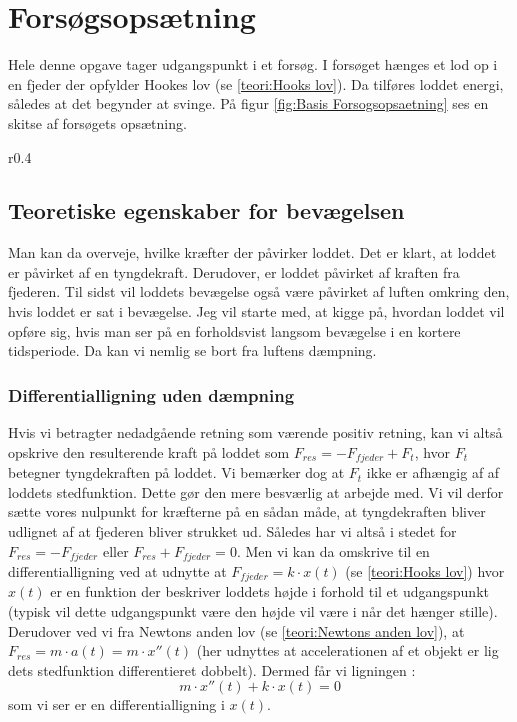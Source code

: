 \section{Forsøgsopsætning}\label{teori: opsatning af differentialligninger}
Hele denne opgave tager udgangspunkt i et forsøg.
I forsøget hænges et lod op i en fjeder der opfylder Hookes lov (se \ref{teori:Hooks lov}). 
Da tilføres loddet energi, således at det begynder at svinge. 
På figur \ref{fig:Basis Forsogsopsaetning} ses en skitse af forsøgets opsætning.

\begin{wrapfigure}{r}{0.4\textwidth}
\centering
{}%

\caption{Skitse af forsøgsopsætning.}
\label{fig:Basis Forsogsopsaetning}
\end{wrapfigure} 

\subsection{Teoretiske egenskaber for bevægelsen}
Man kan da overveje, hvilke kræfter der påvirker loddet. 
Det er klart, at loddet er påvirket af en tyngdekraft. 
Derudover, er loddet påvirket af kraften fra fjederen.
Til sidst vil loddets bevægelse også være påvirket af luften omkring den, hvis loddet er sat i bevægelse. 
Jeg vil starte med, at kigge på, hvordan loddet vil opføre sig, hvis man ser på en forholdsvist langsom bevægelse i en kortere tidsperiode.
Da kan vi nemlig se bort fra luftens dæmpning. 

\subsubsection{Differentialligning uden dæmpning}\label{teori: Opstilling ligning uden dampning}
Hvis vi betragter nedadgående retning som værende positiv retning, kan vi altså opskrive den resulterende kraft på loddet som $F_{res} = -F_{fjeder}+F_{t}$, hvor $F_t$ betegner tyngdekraften på loddet. 
Vi bemærker dog at $F_t$ ikke er afhængig af af loddets stedfunktion. 
Dette gør den mere besværlig at arbejde med. 
Vi vil derfor sætte vores nulpunkt for kræfterne på en sådan måde, at tyngdekraften bliver udlignet af at fjederen bliver strukket ud. 
Således har vi altså i stedet for $F_{res}=-F_{fjeder}$ eller $F_{res}+F_{fjeder}=0$.
Men vi kan da omskrive til en differentialligning ved at udnytte at $F_{fjeder}=k \cdot x(t)$ (se \ref{teori:Hooks lov}) hvor $x(t)$ er en funktion der beskriver loddets højde i forhold til et udgangspunkt (typisk vil dette udgangspunkt være den højde vil være i når det hænger stille).  
Derudover ved vi fra Newtons anden lov (se \ref{teori:Newtons anden lov}), at $F_{res}=m\cdot a(t) = m \cdot x''(t)$ 
(her udnyttes at accelerationen af et objekt er lig dets stedfunktion differentieret dobbelt). 
Dermed får vi ligningen :
$$m\cdot x''(t)+k\cdot x(t)=0$$ 
som vi ser er en differentialligning i $x(t)$.

